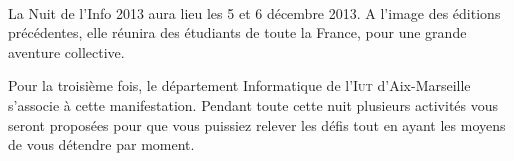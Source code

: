 \documentclass[a4paper,11pt]{article}
\date{}
\begin{document}

\newlength{\niveauZero}
\newlength{\niveauUn}
\newlength{\niveauDeux}
\newlength{\niveauTrois}
\newlength{\niveauQuatre}
\newlength{\niveauCinq}

\newlength{\colonneZero}
\newlength{\colonneUn}
\newlength{\colonneDeux}
\newlength{\colonneTrois}
\newlength{\colonneQuatre}
\newlength{\colonneCinq}

{\centering
    \mbox{
    }
}

La Nuit de l'Info 2013 aura lieu les 5 et 6 décembre 2013. A l'image des éditions précédentes, elle réunira des étudiants de toute la France, pour une grande aventure collective.

Pour la troisième fois, le département Informatique de l'\textsc{Iut} d'Aix-Marseille s'associe à cette manifestation. Pendant toute cette nuit plusieurs activités vous seront proposées pour que vous puissiez relever les défis tout en ayant les moyens de vous détendre par moment.
\end{document}
